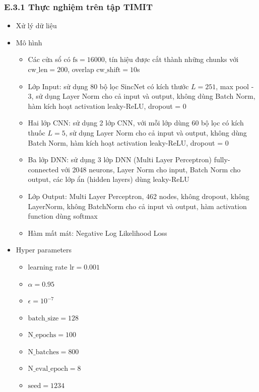 \documentclass{article}
\begin{document}
	\subsubsection{E.3.1 Thực nghiệm trên tập TIMIT}
	\begin{itemize}
		\item Xử lý dữ liệu
		\item Mô hình 
		\begin{itemize}
			\item Các cửa sổ có $\text{fs} = 16000$, tín hiệu được cắt thành những chunks với $\text{cw\_len}=200$, overlap $\text{cw\_shift}=10$s
			\item Lớp Input: sử dụng 80 bộ lọc SincNet có kích thước $L=251$, max pool - 3, sử dụng Layer Norm cho cả input và output, không dùng Batch Norm, hàm kích hoạt activation leaky-ReLU, dropout = 0
			\item Hai lớp CNN: sử dụng 2 lớp CNN, với mỗi lớp dùng 60 bộ lọc có kích thuốc $L=5$, sử dụng Layer Norm cho cả input và output, không dùng Batch Norm, hàm kích hoạt activation leaky-ReLU, dropout = 0
			\item Ba lớp DNN: sử dụng 3 lớp DNN (Multi Layer Perceptron) fully-connected với 2048 neurons, Layer Norm cho input, Batch Norm cho output, các lớp ẩn (hidden layers) dùng leaky-ReLU
			\item Lớp Output: Multi Layer Perceptron, 462 nodes, không dropout, không LayerNorm, không BatchNorm cho cả input và output, hàm activation function dùng softmax
			\item Hàm mất mát: Negative Log Likelihood Loss
		\end{itemize}
		\item Hyper parameters
		\begin{itemize}
			\item learning rate $\text{lr} = 0.001$
			\item $\alpha = 0.95$
			\item $\epsilon = 10^{-7}$
			\item $\text{batch\_size}=128$
			\item $\text{N\_epochs}=100$
			\item $\text{N\_batches}=800$
			\item $\text{N\_eval\_epoch}=8$
			\item $\text{seed}=1234$
		\end{itemize}
	\end{itemize}
\end{document}
